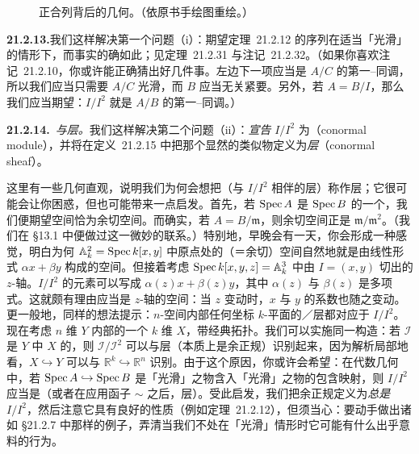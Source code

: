 \begin{figure}[htbp]
\centering
{}
\caption{\trConormal{}正合列背后的几何。（依原书手绘图重绘。）}\label{fig:conormal-exact-sequence-geometry}
\end{figure}

\textbf{21.2.13.}\quad 我们这样解决第一个问题（i）：期望\mbox{定理~21.2.12} 的序列在适当「光滑」的情形下\trLeftExact，而事实的确如此；见\mbox{定理~21.2.31} 与\mbox{注记~21.2.32}。（如果你喜欢\mbox{注记~21.2.10}，你或许能正确猜出好几件事。左边下一项应当是 $A/C$ 的第一\trAndre--\trQuillen{}同调，所以我们应当只需要 $A/C$ 光滑，而 $B$ 应当无关紧要。另外，若 $A=B/I$，那么我们应当期望：$I/I^2$ 就是 $A/B$ 的第一\trAndre--\trQuillen{}同调。）

\textbf{21.2.14.}\ \emph{\trConormalSheaf{}与\trConormal{}层。}\quad 我们这样解决第二个问题（ii）：\emph{宣告} $I/I^2$ 为\textbf{\trConormalSheaf}（conormal module），并将在\mbox{定义~21.2.15} 中把那个显然的类似物定义为\emph{\trConormal{}层}（conormal sheaf）。

这里有一些几何直观，说明我们为何会想把（与 $I/I^2$ 相伴的层）称作\trConormal{}层；它很可能会让你困惑，但也可能带来一点启发。首先，若 $\operatorname{Spec} A$ 是 $\operatorname{Spec} B$ 的一个\trClosedPoint，我们便期望\trConormal{}空间恰为余切空间。而确实，若 $A=B/\mathfrak{m}$，则\trZariski{}余切空间正是 $\mathfrak{m}/\mathfrak{m}^2$。（我们在 \S13.1 中便做过这一微妙的联系。）特别地，早晚会有一天，你会形成一种感觉，明白为何 $\mathbb{A}^2_k=\operatorname{Spec} k[x,y]$ 中原点处的\trConormal（＝余切）空间自然地就是由线性形式 $\alpha x+\beta y$ 构成的空间。但接着考虑 $\operatorname{Spec} k[x,y,z]=\mathbb{A}^3_k$ 中由 $I=(x,y)$ 切出的 $z$-轴。$I/I^2$ 的元素可以写成 $\alpha(z)x+\beta(z)y$，其中 $\alpha(z)$ 与 $\beta(z)$ 是多项式。这就颇有理由应当是 $z$-轴的\trConormal{}空间：当 $z$ 变动时，$x$ 与 $y$ 的系数也随之变动。更一般地，同样的想法提示：$n$-空间内部任何坐标 $k$-平面的\trConormalSheaf／\trConormal{}层都对应于 $I/I^2$。现在考虑 $n$ 维\trManifold{} $Y$ 内部的一个 $k$ 维\trManifold{} $X$，带经典拓扑。我们可以实施同一构造：若 $\mathscr{I}$ 是 $Y$ 中 $X$ 的\trIdealSheaf，则 $\mathscr{I}/\mathscr{I}^2$ 可以与\trConormal{}层（本质上是余正规\trVectorBundle）识别起来，因为解析局部地看，$X\hookrightarrow Y$ 可以与 $\mathbb{R}^k\hookrightarrow\mathbb{R}^n$ 识别。由于这个原因，你或许会希望：在代数几何中，若 $\operatorname{Spec} A\hookrightarrow\operatorname{Spec} B$ 是「光滑」之物含入「光滑」之物的包含映射，则 $I/I^2$ 应当是\trConormalSheaf（或者在应用函子 $\sim$ 之后，\trConormal{}层）。受此启发，我们把余正规定义为\emph{总是} $I/I^2$，然后注意它具有良好的性质（例如\mbox{定理~21.2.12}），但须当心：要动手做出诸如 \S21.2.7 中那样的例子，弄清当我们不处在「光滑」情形时它可能有什么出乎意料的行为。


